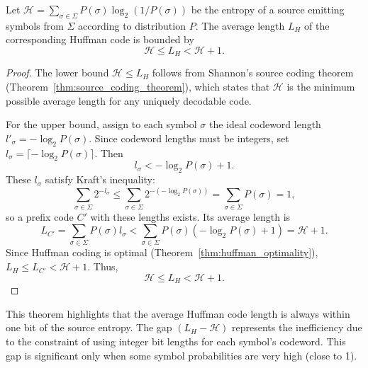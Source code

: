 \begin{theorem} \label{thm:huffman_bounds}
    Let $\mathcal{H} = \sum_{\sigma \in \Sigma} P(\sigma)\log_2(1/P(\sigma))$ be the entropy of a source emitting symbols from $\Sigma$ according to distribution $P$. The average length $L_H$ of the corresponding Huffman code is bounded by
    \begin{equation*}
        \mathcal{H} \le L_H < \mathcal{H} + 1.
    \end{equation*}
\end{theorem}
\begin{proof}
    The lower bound $\mathcal{H} \le L_H$ follows from Shannon's source coding theorem (Theorem~\ref{thm:source_coding_theorem}), which states that $\mathcal{H}$ is the minimum possible average length for any uniquely decodable code.

    For the upper bound, assign to each symbol $\sigma$ the ideal codeword length $l'_\sigma = -\log_2 P(\sigma)$. Since codeword lengths must be integers, set $l_\sigma = \lceil -\log_2 P(\sigma) \rceil$. Then
    \begin{equation*}
        l_\sigma < -\log_2 P(\sigma) + 1.
    \end{equation*}
    These $l_\sigma$ satisfy Kraft's inequality:
    \begin{equation*}
        \sum_{\sigma \in \Sigma} 2^{-l_\sigma} \le \sum_{\sigma \in \Sigma} 2^{-(-\log_2 P(\sigma))} = \sum_{\sigma \in \Sigma} P(\sigma) = 1,
    \end{equation*}
    so a prefix code $C'$ with these lengths exists. Its average length is
    \begin{equation*}
        L_{C'} = \sum_{\sigma \in \Sigma} P(\sigma) l_\sigma < \sum_{\sigma \in \Sigma} P(\sigma) (-\log_2 P(\sigma) + 1) = \mathcal{H} + 1.
    \end{equation*}
    Since Huffman coding is optimal (Theorem~\ref{thm:huffman_optimality}), $L_H \le L_{C'} < \mathcal{H} + 1$. Thus,
    \begin{equation*}
        \mathcal{H} \le L_H < \mathcal{H} + 1.
    \end{equation*}
\end{proof}

This theorem highlights that the average Huffman code length is always within one bit of the source entropy. The gap $(L_H - \mathcal{H})$ represents the inefficiency due to the constraint of using integer bit lengths for each symbol's codeword. This gap is significant only when some symbol probabilities are very high (close to 1).

